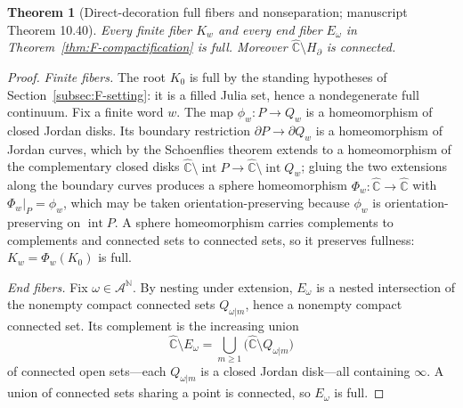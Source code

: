 \documentclass[11pt,reqno]{amsart}
\newtheorem{theorem}{Theorem}[section]
\theoremstyle{definition}
\theoremstyle{remark}
\newcommand{\Chat}{\widehat{\mathbb C}}
\newcommand{\Int}{\operatorname{int}}
\begin{document}
\begin{theorem}[Direct-decoration full fibers and nonseparation;
manuscript Theorem 10.40]\label{thm:full-fibers}
Every finite fiber $K_w$ and every end fiber $E_\omega$ in
Theorem~\ref{thm:F-compactification} is full.  Moreover
$\Chat\setminus H_\partial$ is connected.
\end{theorem}

\begin{proof}
\emph{Finite fibers.}
The root $K_0$ is full by the standing hypotheses of
Section~\ref{subsec:F-setting}: it is a filled Julia set, hence a
nondegenerate full continuum.  Fix a finite word $w$.  The map
$\phi_w\colon P\to Q_w$ is a homeomorphism of closed Jordan disks.  Its
boundary restriction $\partial P\to\partial Q_w$ is a homeomorphism of
Jordan curves, which by the Schoenflies theorem \cite{New51} extends to a
homeomorphism of the complementary closed disks
$\Chat\setminus\Int P\to\Chat\setminus\Int Q_w$; gluing the two
extensions along the boundary curves produces a sphere homeomorphism
$\Phi_w\colon\Chat\to\Chat$ with $\Phi_w|_P=\phi_w$, which may be taken
orientation-preserving because $\phi_w$ is orientation-preserving on
$\Int P$.  A sphere homeomorphism carries complements to complements and
connected sets to connected sets, so it preserves fullness:
$K_w=\Phi_w(K_0)$ is full.

\emph{End fibers.}
Fix $\omega\in\mathcal A^{\mathbb N}$.  By nesting under extension,
$E_\omega$ is a nested intersection of the nonempty compact connected
sets $Q_{\omega|m}$, hence a nonempty compact connected set.  Its
complement is the increasing union
\[
\Chat\setminus E_\omega
=\bigcup_{m\ge1}\bigl(\Chat\setminus Q_{\omega|m}\bigr)
\]
of connected open sets---each $Q_{\omega|m}$ is a closed Jordan
disk---all containing $\infty$.  A union of connected sets sharing a
point is connected, so $E_\omega$ is full.


\end{proof}
\end{document}
